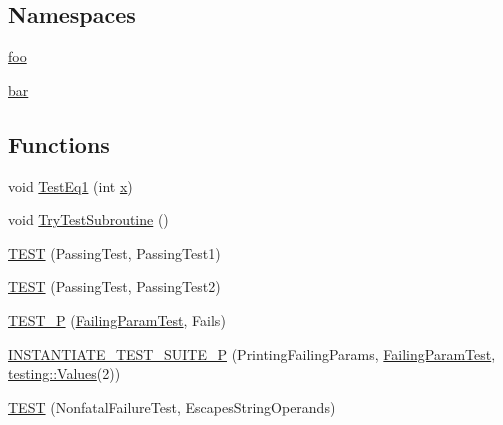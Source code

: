 \subsection*{Namespaces}
\begin{DoxyCompactItemize}
\item 
 \mbox{\hyperlink{namespacefoo}{foo}}
\item 
 \mbox{\hyperlink{namespacebar}{bar}}
\end{DoxyCompactItemize}
\subsection*{Functions}
\begin{DoxyCompactItemize}
\item 
void \mbox{\hyperlink{_obj__test_2lib_2googletest-master_2googletest_2test_2googletest-output-test___8cc_a8f28d985b030c6dd2714d1e884c62c41}{Test\+Eq1}} (int \mbox{\hyperlink{_obj__test_2lib_2googletest-master_2googlemock_2test_2gmock-matchers__test_8cc_a6150e0515f7202e2fb518f7206ed97dc}{x}})
\item 
void \mbox{\hyperlink{_obj__test_2lib_2googletest-master_2googletest_2test_2googletest-output-test___8cc_a14e796981ca8d3c71dbd2b839c1ce784}{Try\+Test\+Subroutine}} ()
\item 
\mbox{\hyperlink{_obj__test_2lib_2googletest-master_2googletest_2test_2googletest-output-test___8cc_a62f1870b5f6ce5c731fe0606a944da39}{T\+E\+ST}} (Passing\+Test, Passing\+Test1)
\item 
\mbox{\hyperlink{_obj__test_2lib_2googletest-master_2googletest_2test_2googletest-output-test___8cc_aaf792b2d65c4aeb1e2f1804e2319afd2}{T\+E\+ST}} (Passing\+Test, Passing\+Test2)
\item 
\mbox{\hyperlink{_obj__test_2lib_2googletest-master_2googletest_2test_2googletest-output-test___8cc_a680b45844b58c5367da52c5383aea03a}{T\+E\+S\+T\+\_\+P}} (\mbox{\hyperlink{class_failing_param_test}{Failing\+Param\+Test}}, Fails)
\item 
\mbox{\hyperlink{_obj__test_2lib_2googletest-master_2googletest_2test_2googletest-output-test___8cc_a7917783e750c5d42b4d0b6907c340c7e}{I\+N\+S\+T\+A\+N\+T\+I\+A\+T\+E\+\_\+\+T\+E\+S\+T\+\_\+\+S\+U\+I\+T\+E\+\_\+P}} (Printing\+Failing\+Params, \mbox{\hyperlink{class_failing_param_test}{Failing\+Param\+Test}}, \mbox{\hyperlink{namespacetesting_abd3c87b40c2a0663691c9b617ed5fcc2}{testing\+::\+Values}}(2))
\item 
\mbox{\hyperlink{_obj__test_2lib_2googletest-master_2googletest_2test_2googletest-output-test___8cc_a1ae5db2b27aea7d9f321f52002d4a501}{T\+E\+ST}} (Nonfatal\+Failure\+Test, Escapes\+String\+Operands)

\end{DoxyCompactItemize}
